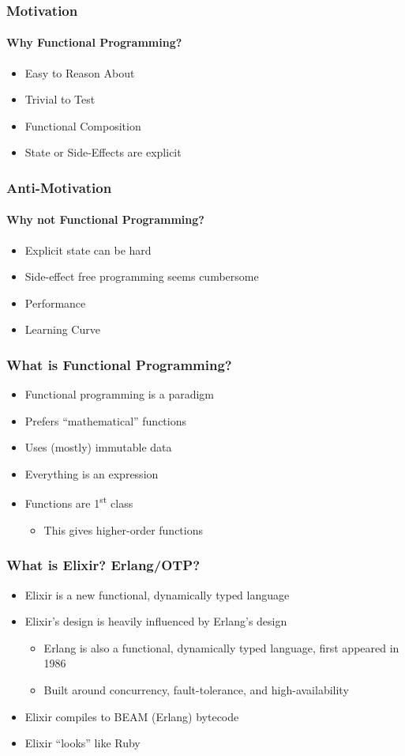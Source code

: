 \documentclass[english]{beamer}
\begin{document}
\begin{frame}
\frametitle{Motivation}
\framesubtitle{Why Functional Programming?}
\begin{itemize}
\item<1->{Easy to Reason About}
\item<2->{Trivial to Test}
\item<3->{Functional Composition}
\item<4->{State or Side-Effects are explicit}
\end{itemize}
\end{frame}

\begin{frame}
\frametitle{Anti-Motivation}
\framesubtitle{Why not Functional Programming?}
\begin{itemize}
\item<1->{Explicit state can be hard}
\item<2->{Side-effect free programming seems cumbersome}
\item<3->{Performance}
\item<4->{Learning Curve}
\end{itemize}
\end{frame}

\begin{frame}
\frametitle{What is Functional Programming?}
\begin{itemize}
\item<1->{Functional programming is a paradigm} %
\item<2->{Prefers ``mathematical'' functions}
\item<3->{Uses (mostly) immutable data} %
\item<4->{Everything is an expression}
\item<5->{Functions are 1\textsuperscript{st} class}
\begin{itemize}
\item<6->{This gives higher-order functions}
\end{itemize}
\end{itemize}
\end{frame}

\begin{frame}
\frametitle{What is Elixir? Erlang/OTP?}
\begin{itemize}
\item<1->{Elixir is a new functional, dynamically typed language}
\item<2->{Elixir's design is heavily influenced by Erlang's design}
\begin{itemize}
\item<3->{Erlang is also a functional, dynamically typed language, first
appeared in 1986}
\item<4->{Built around concurrency, fault-tolerance, and high-availability}
\end{itemize}
\item<5->{Elixir compiles to BEAM (Erlang) bytecode}
\item<6->{Elixir ``looks'' like Ruby} %
\end{itemize}
\end{frame}
\end{document}
